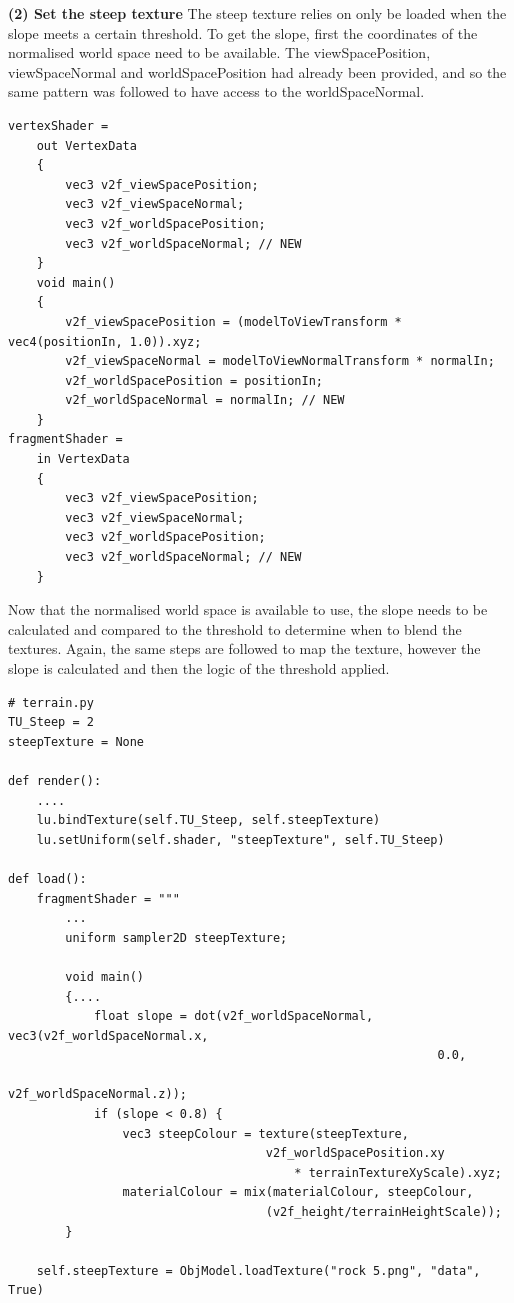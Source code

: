 \documentclass[a4 paper, 12pt]{article}
\begin{document}
\textbf{(2) Set the steep texture}
The steep texture relies on only be loaded when the slope meets a certain threshold. To get the slope, first the coordinates of the normalised world space need to be available. The viewSpacePosition, viewSpaceNormal and worldSpacePosition had already been provided, and so the same pattern was followed to have access to the worldSpaceNormal.
    \begin{lstlisting}
vertexShader =
    out VertexData
    {
        vec3 v2f_viewSpacePosition;
        vec3 v2f_viewSpaceNormal;
        vec3 v2f_worldSpacePosition;
        vec3 v2f_worldSpaceNormal; // NEW
    }
    void main()
    {
        v2f_viewSpacePosition = (modelToViewTransform * vec4(positionIn, 1.0)).xyz;
        v2f_viewSpaceNormal = modelToViewNormalTransform * normalIn;
        v2f_worldSpacePosition = positionIn;
        v2f_worldSpaceNormal = normalIn; // NEW
    }
fragmentShader = 
    in VertexData
    {
        vec3 v2f_viewSpacePosition;
        vec3 v2f_viewSpaceNormal;
        vec3 v2f_worldSpacePosition;
        vec3 v2f_worldSpaceNormal; // NEW
    }
    \end{lstlisting}

Now that the normalised world space is available to use, the slope needs to be calculated and compared to the threshold to determine when to blend the textures. Again, the same steps are followed to map the texture, however the slope is calculated and then the logic of the threshold applied. 
    \begin{lstlisting}
# terrain.py
TU_Steep = 2
steepTexture = None

def render():
    ....
    lu.bindTexture(self.TU_Steep, self.steepTexture)
    lu.setUniform(self.shader, "steepTexture", self.TU_Steep)

def load():
    fragmentShader = """
        ...
        uniform sampler2D steepTexture;

        void main()
        {....
            float slope = dot(v2f_worldSpaceNormal, vec3(v2f_worldSpaceNormal.x, 
                                                            0.0, 
                                                            v2f_worldSpaceNormal.z));
            if (slope < 0.8) {
                vec3 steepColour = texture(steepTexture, 
                                    v2f_worldSpacePosition.xy 
                                        * terrainTextureXyScale).xyz;
                materialColour = mix(materialColour, steepColour, 
                                    (v2f_height/terrainHeightScale));
        } 

    self.steepTexture = ObjModel.loadTexture("rock 5.png", "data", True)
    \end{lstlisting}
\end{document}
